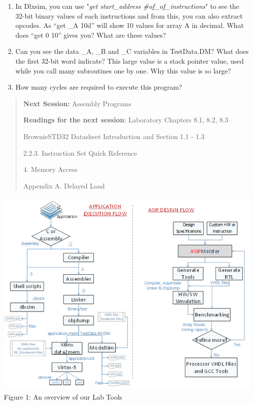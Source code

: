 \documentclass[
]{article}
\begin{document}
\begin{enumerate}
\def\labelenumi{\alph{enumi})}
\setcounter{enumi}{1}
\item
  In Dlxsim, you can use "\emph{get start\_address
  \#of\_of\_instructions}" to see the 32-bit binary values of each
  instructions and from this, you can also extract opcodes. As ``get \_A
  10d'' will show 10 values for array A in decimal. What does ``get 0
  10'' gives you? What are these values?
\item
  Can you see the data \_A, \_B and \_C variables in TestData.DM? What
  does the first 32-bit word indicate? This large value is a stack
  pointer value, used while you call many subroutines one by one. Why
  this value is so large?
\item
  How many cycles are required to execute this program?
\end{enumerate}

\begin{quote}
\textbf{Next Session:} Assembly Programs

\textbf{Readings for the next session}: Laboratory Chapters 8.1, 8.2,
8.3

BrownieSTD32 Datasheet Introduction and Section 1.1 - 1.3

2.2.3. Instruction Set Quick Reference

4. Memory Access

Appendix A. Delayed Load
\end{quote}
\includegraphics[width=5.65694in,height=4.08958in]{1.png}
Figure 1: An overview of our Lab Tools
\end{document}
